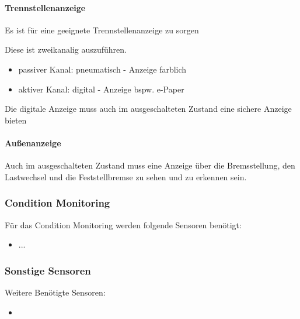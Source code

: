 \paragraph{Trennstellenanzeige}
\begin{feat}
Es ist für eine geeignete Trennstellenanzeige zu sorgen
\end{feat}
\begin{rem}[zu Anf. 22]
Diese ist zweikanalig auszuführen.
\begin{itemize}
    \item passiver Kanal: pneumatisch - Anzeige farblich
    \item aktiver Kanal: digital - Anzeige bspw. e-Paper
\end{itemize}
\end{rem}
\begin{feat}
Die digitale Anzeige muss auch im ausgeschalteten Zustand eine sichere Anzeige bieten
\end{feat}
\paragraph{Außenanzeige}
\begin{feat}
Auch im ausgeschalteten Zustand muss eine Anzeige über die Bremsstellung, den Lastwechsel und die Feststellbremse zu sehen und zu erkennen sein.
\end{feat}

\subsubsection{Condition Monitoring}
\begin{feat}
Für das Condition Monitoring werden folgende Sensoren benötigt:
\begin{itemize}
    \item ...
\end{itemize}
\end{feat}

\subsubsection{Sonstige Sensoren}
\begin{feat}
Weitere Benötigte Sensoren:
\begin{itemize}
    \item 
\end{itemize}
\end{feat}



